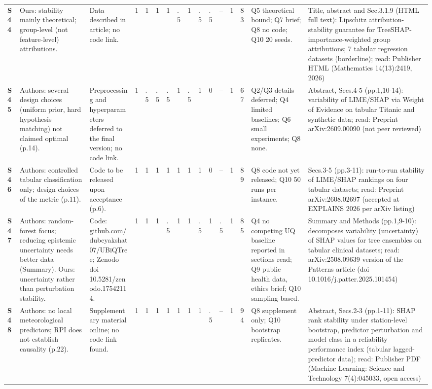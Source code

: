 \begin{longtable}{@{}P{1.0cm}P{4.6cm}P{3.6cm}P{0.3cm}P{0.3cm}P{0.3cm}P{0.3cm}P{0.3cm}P{0.3cm}P{0.3cm}P{0.3cm}P{0.3cm}P{0.36cm}P{0.75cm}P{3.0cm}P{3.9cm}@{}}
\textbf{S44} & Ours: stability mainly theoretical; group-level (not feature-level) attributions. & Data described in article; no code link. & 1 & 1 & 1 & 1 & .5 & 1 & .5 & .5 & -- & 1 & 83 & Q5 theoretical bound; Q7 brief; Q8 no code; Q10 20 seeds. & Title, abstract and Sec.3.1.9 (HTML full text): Lipschitz attribution-stability guarantee for TreeSHAP-importance-weighted group attributions; 7 tabular regression datasets (borderline); read: Publisher HTML (Mathematics 14(13):2419, 2026) \\
\textbf{S45} & Authors: several design choices (uniform prior, hard hypothesis matching) not claimed optimal (p.14). & Preprocessing and hyperparameters deferred to the final version; no code link. & 1 & .5 & .5 & .5 & 1 & .5 & 1 & 0 & -- & 1 & 67 & Q2/\allowbreak{}Q3 details deferred; Q4 limited baselines; Q6 small experiments; Q8 none. & Abstract, Secs.4-5 (pp.1,10-14): variability of LIME/\allowbreak{}SHAP via Weight of Evidence on tabular Titanic and synthetic data; read: Preprint arXiv:2609.00090 (not peer reviewed) \\
\textbf{S46} & Authors: controlled tabular classification only; design choices of the metric (p.11). & Code to be released upon acceptance (p.6). & 1 & 1 & 1 & 1 & 1 & 1 & 1 & 0 & -- & 1 & 89 & Q8 code not yet released; Q10 50 runs per instance. & Secs.3-5 (pp.3-11): run-to-run stability of LIME/\allowbreak{}SHAP rankings on four tabular datasets; read: Preprint arXiv:2608.02697 (accepted at EXPLAINS 2026 per arXiv listing) \\
\textbf{S47} & Authors: random-forest focus; reducing epistemic uncertainty needs better data (Summary). Ours: uncertainty rather than perturbation stability. & Code: github.com/\allowbreak{}dubeyakshat07/\allowbreak{}UBiQTree; Zenodo doi 10.5281/\allowbreak{}zenodo.17542114. & 1 & 1 & 1 & .5 & 1 & 1 & .5 & 1 & .5 & 1 & 85 & Q4 no competing UQ baseline reported in sections read; Q9 public health data, ethics brief; Q10 sampling-based. & Summary and Methods (pp.1,9-10): decomposes variability (uncertainty) of SHAP values for tree ensembles on tabular clinical datasets; read: arXiv:2508.09639 version of the Patterns article (doi 10.1016/\allowbreak{}j.patter.2025.101454) \\
\textbf{S48} & Authors: no local meteorological predictors; RPI does not establish causality (p.22). & Supplementary material online; no code link found. & 1 & 1 & 1 & 1 & 1 & 1 & 1 & .5 & -- & 1 & 94 & Q8 supplement only; Q10 bootstrap replicates. & Abstract, Secs.2-3 (pp.1-11): SHAP rank stability under station-level bootstrap, predictor perturbation and model class in a reliability performance index (tabular lagged-predictor data); read: Publisher PDF (Machine Learning: Science and Technology 7(4):045033, open access) \\

\end{longtable}
